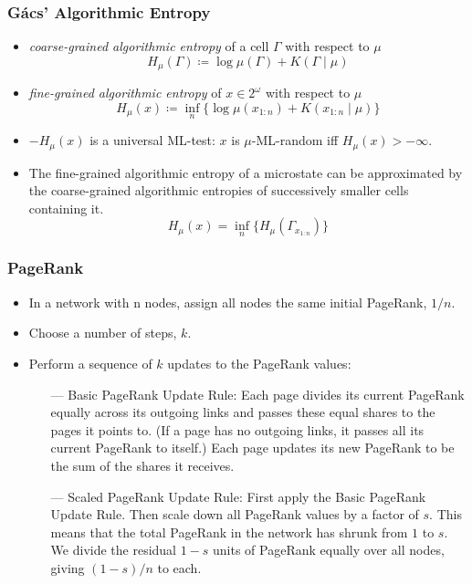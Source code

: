\documentclass[UTF8,11pt,colorlinks,compress,openany]{beamer}%
\begin{document}
\begin{frame}\frametitle{G\'acs' Algorithmic Entropy}
\setlength\abovedisplayskip{0pt}
\setlength\belowdisplayskip{0pt}
\begin{definition}
\begin{itemize}
	\item \emph{coarse-grained algorithmic entropy} of a cell $\Gamma$ with respect to $\mu$
	\[H_\mu(\Gamma)\coloneqq \log\mu(\Gamma)+K(\Gamma\mid \mu)\]
	\item \emph{fine-grained algorithmic entropy} of $x\in 2^\omega$ with respect to $\mu$
	\[H_\mu(x)\coloneqq \inf_n\big\{\log\mu(x_{1:n})+K(x_{1:n}\mid \mu)\big\}\]
\end{itemize}
\end{definition}
\begin{itemize}
	\item $-H_\mu(x)$ is a universal ML-test: $x$ is $\mu$-ML-random iff $H_\mu(x)>-\infty$.
	\item The fine-grained algorithmic entropy of a microstate can be approximated by the coarse-grained algorithmic entropies of successively smaller cells containing it.
	\[H_\mu(x)=\inf_n\big\{H_\mu(\Gamma_{x_{1:n}})\big\}\]
\end{itemize}
\end{frame}

\begin{frame}\frametitle{PageRank}
\begin{itemize}
	\item In a network with n nodes, assign all nodes the same initial PageRank, $1/n$.
	\item Choose a number of steps, $k$.
	\item Perform a sequence of $k$ updates to the PageRank values:
	\begin{itemize}
		\item[---] Basic PageRank Update Rule: Each page divides its current PageRank equally across its outgoing links and passes these equal shares to the pages it points to. (If a page has no outgoing links, it passes all its current PageRank to itself.) Each page updates its new PageRank to be the sum of the shares it receives.
		\item[---] Scaled PageRank Update Rule: First apply the Basic PageRank Update Rule. Then scale down all PageRank values by a factor of $s$. This means that the total PageRank in the network has shrunk from $1$ to $s$. We divide the residual $1-s$ units of PageRank equally over all nodes, giving $(1-s)/n$ to each.
	\end{itemize}
\end{itemize}	
\end{frame}
\end{document}

